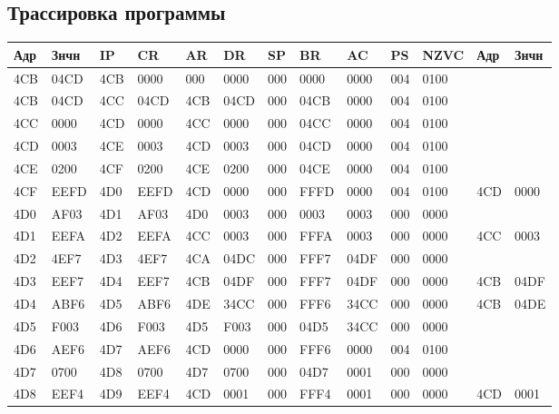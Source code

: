 \documentclass[14pt]{extreport}
\begin{document}
        \begin{landscape}
            \chapter{Трассировка программы}
            \begin{table}[!h]
                \centering
                \begin{tabular}{|l|l|l|l|l|l|l|l|l|l|l|l|l|}
                    \hline
                    Адр & Знчн & IP & CR & AR & DR & SP & BR & AC & PS & NZVC & Адр & Знчн \\
                    \hline
                    4CB & 04CD & 4CB & 0000 & 000 & 0000 & 000 & 0000 & 0000 & 004 & 0100 &&\\
                    4CB & 04CD & 4CC & 04CD & 4CB & 04CD & 000 & 04CB & 0000 & 004 & 0100 &&\\
                    4CC & 0000 & 4CD & 0000 & 4CC & 0000 & 000 & 04CC & 0000 & 004 & 0100 &&\\
                    4CD & 0003 & 4CE & 0003 & 4CD & 0003 & 000 & 04CD & 0000 & 004 & 0100 &&\\
                    4CE & 0200 & 4CF & 0200 & 4CE & 0200 & 000 & 04CE & 0000 & 004 & 0100 &&\\
                    4CF & EEFD & 4D0 & EEFD & 4CD & 0000 & 000 & FFFD & 0000 & 004 & 0100 & 4CD & 0000 \\
                    4D0 & AF03 & 4D1 & AF03 & 4D0 & 0003 & 000 & 0003 & 0003 & 000 & 0000 &&\\
                    4D1 & EEFA & 4D2 & EEFA & 4CC & 0003 & 000 & FFFA & 0003 & 000 & 0000 & 4CC & 0003 \\
                    4D2 & 4EF7 & 4D3 & 4EF7 & 4CA & 04DC & 000 & FFF7 & 04DF & 000 & 0000 &&\\
                    4D3 & EEF7 & 4D4 & EEF7 & 4CB & 04DF & 000 & FFF7 & 04DF & 000 & 0000 & 4CB & 04DF \\
                    4D4 & ABF6 & 4D5 & ABF6 & 4DE & 34CC & 000 & FFF6 & 34CC & 000 & 0000 & 4CB & 04DE \\
                    4D5 & F003 & 4D6 & F003 & 4D5 & F003 & 000 & 04D5 & 34CC & 000 & 0000 &&\\
                    4D6 & AEF6 & 4D7 & AEF6 & 4CD & 0000 & 000 & FFF6 & 0000 & 004 & 0100 &&\\
                    4D7 & 0700 & 4D8 & 0700 & 4D7 & 0700 & 000 & 04D7 & 0001 & 000 & 0000 &&\\
                    4D8 & EEF4 & 4D9 & EEF4 & 4CD & 0001 & 000 & FFF4 & 0001 & 000 & 0000 & 4CD & 0001 \\

\end{tabular}
\end{table}
\end{landscape}
\end{document}
